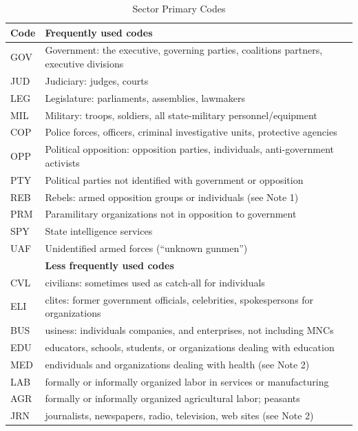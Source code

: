 \documentclass[11pt]{report}
\begin{document}
\begin{center}
\begin{longtable}{|l|p{13cm}|}
\caption{Sector Primary Codes}
\label{tab:roles}
 \\ \cline{1-2}
  \textbf{Code} & \textbf{Frequently used codes}\\
  \hline
      GOV & Government: the executive, governing parties, coalitions partners, executive divisions \\ 
      JUD & Judiciary: judges, courts \\ 
      LEG & Legislature: parliaments, assemblies, lawmakers \\
      MIL & Military: troops, soldiers, all state-military personnel/equipment\\ 
      COP & Police forces, officers, criminal investigative units, protective agencies \\ 
      OPP & Political opposition: opposition parties, individuals, anti-government activists \\
      PTY & Political parties not identified with government or opposition \\
      REB & Rebels: armed opposition groups or individuals (see Note 1)\\ 
      PRM & Paramilitary organizations not in opposition to government\\ 
      SPY & State intelligence services \\ 
      UAF & Unidentified armed forces (``unknown gunmen'') \\ 
  \hline
~   & \textbf{Less frequently used codes}\\
 \hline
      CVL & civilians: sometimes used as catch-all for individuals \\
      ELI & clites: former government officials, celebrities, spokespersons for organizations \\
      BUS & usiness: individuals companies, and enterprises, not including MNCs \\  
      EDU & educators, schools, students, or organizations dealing with education \\ 
      MED & endividuals and organizations dealing with health (see Note 2) \\
      LAB & formally or informally organized labor in services or manufacturing \\
      AGR & formally or informally organized agricultural labor; peasants \\
      JRN & journalists, newspapers, radio, television, web sites (see Note 2)  \\ 

\end{longtable}
\end{center}
\end{document}

